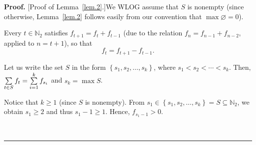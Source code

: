 \documentclass[numbers=enddot,12pt,final,onecolumn,notitlepage]{scrartcl}%
\numberwithin{exer}{section}
\theoremstyle{definition}
\newenvironment{proof}[1][Proof]{\noindent\textbf{#1.} }{\ \rule{0.5em}{0.5em}}
\let\sumnonlimits\sum
\renewcommand{\sum}{\sumnonlimits\limits}
\begin{document}
\begin{proof}
[Proof of Lemma~\ref{lem.2}.]We WLOG assume that $S$ is nonempty (since
otherwise, Lemma~\ref{lem.2} follows easily from our convention that
$\max\varnothing=0$).

Every $t\in\mathbb{N}_{2}$ satisfies $f_{t+1}=f_{t}+f_{t-1}$ (due to the
relation $f_{n}=f_{n-1}+f_{n-2}$, applied to $n=t+1$), so that
\begin{equation}
f_{t}=f_{t+1}-f_{t-1}. \label{pf.lem.2.rec-}%
\end{equation}


Let us write the set $S$ in the form $\left\{  s_{1},s_{2},\ldots
,s_{k}\right\}  $, where $s_{1}<s_{2}<\cdots<s_{k}$. Then, $\sum\limits_{t\in
S}f_{t}=\sum\limits_{i=1}^{k}f_{s_{i}}$ and $s_{k}=\max S$.

Notice that $k\geq1$ (since $S$ is nonempty). From $s_{1}\in\left\{
s_{1},s_{2},\ldots,s_{k}\right\}  =S\subseteq\mathbb{N}_{2}$, we obtain
$s_{1}\geq2$ and thus $s_{1}-1\geq1$. Hence, $f_{s_{1}-1}>0$.


\end{proof}
\end{document}
